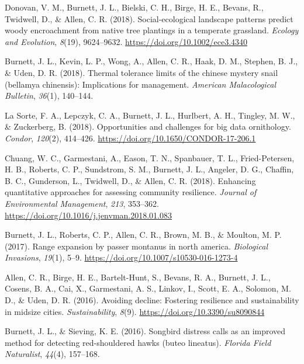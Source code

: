 \documentclass[11pt,a4paper,]{awesome-cv}
\begin{document}
\leavevmode{}%
Donovan, V. M., Burnett, J. L., Bielski, C. H., Birge, H. E., Bevans,
R., Twidwell, D., \& Allen, C. R. (2018). Social-ecological landscape
patterns predict woody encroachment from native tree plantings in a
temperate grassland. \emph{Ecology and Evolution}, \emph{8}(19),
9624--9632. \url{https://doi.org/10.1002/ece3.4340}

\leavevmode{}%
Burnett, J. L., Kevin, L. P., Wong, A., Allen, C. R., Haak, D. M.,
Stephen, B. J., \& Uden, D. R. (2018). Thermal tolerance limits of the
chinese mystery snail (bellamya chinensis): Implications for management.
\emph{American Malacological Bulletin}, \emph{36}(1), 140--144.

\leavevmode{}%
La Sorte, F. A., Lepczyk, C. A., Burnett, J. L., Hurlbert, A. H.,
Tingley, M. W., \& Zuckerberg, B. (2018). Opportunities and challenges
for big data ornithology. \emph{Condor}, \emph{120}(2), 414--426.
\url{https://doi.org/10.1650/CONDOR-17-206.1}

\leavevmode{}%
Chuang, W. C., Garmestani, A., Eason, T. N., Spanbauer, T. L.,
Fried-Petersen, H. B., Roberts, C. P., Sundstrom, S. M., Burnett, J. L.,
Angeler, D. G., Chaffin, B. C., Gunderson, L., Twidwell, D., \& Allen,
C. R. (2018). Enhancing quantitative approaches for assessing community
resilience. \emph{Journal of Environmental Management}, \emph{213},
353--362. \url{https://doi.org/10.1016/j.jenvman.2018.01.083}

\leavevmode{}%
Burnett, J. L., Roberts, C. P., Allen, C. R., Brown, M. B., \& Moulton,
M. P. (2017). Range expansion by passer montanus in north america.
\emph{Biological Invasions}, \emph{19}(1), 5--9.
\url{https://doi.org/10.1007/s10530-016-1273-4}

\leavevmode{}%
Allen, C. R., Birge, H. E., Bartelt-Hunt, S., Bevans, R. A., Burnett, J.
L., Cosens, B. A., Cai, X., Garmestani, A. S., Linkov, I., Scott, E. A.,
Solomon, M. D., \& Uden, D. R. (2016). Avoiding decline: Fostering
resilience and sustainability in midsize cities. \emph{Sustainability},
\emph{8}(9). \url{https://doi.org/10.3390/su8090844}

\leavevmode{}%
Burnett, J. L., \& Sieving, K. E. (2016). Songbird distress calls as an
improved method for detecting red-shouldered hawks (buteo lineatus).
\emph{Florida Field Naturalist}, \emph{44}(4), 157--168.
\end{document}
